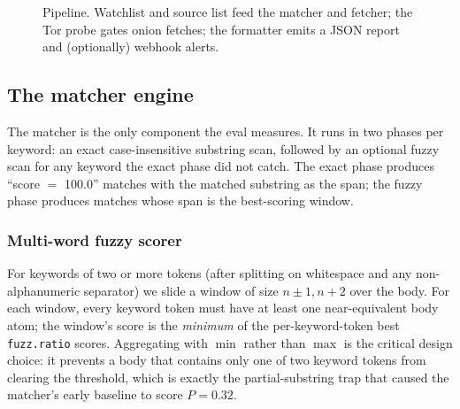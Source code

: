 \documentclass[conference]{IEEEtran}
\begin{document}
\begin{figure}[htbp]
\centering
{}
\caption{Pipeline. Watchlist and source list feed the matcher and
fetcher; the Tor probe gates onion fetches; the formatter emits a
JSON report and (optionally) webhook alerts.}
\label{fig:pipeline}
\end{figure}

\subsection{The matcher engine}
The matcher is the only component the eval measures. It runs in
two phases per keyword: an exact case-insensitive substring scan,
followed by an optional fuzzy scan for any keyword the exact phase
did not catch. The exact phase produces ``score $=$ 100.0''
matches with the matched substring as the span; the fuzzy phase
produces matches whose span is the best-scoring window.

\subsubsection{Multi-word fuzzy scorer}
For keywords of two or more tokens (after splitting on whitespace
and any non-alphanumeric separator) we slide a window of size
$n \pm 1, n + 2$ over the body. For each window, every keyword
token must have at least one near-equivalent body atom; the
window's score is the \emph{minimum} of the per-keyword-token best
\texttt{fuzz.ratio} scores. Aggregating with $\min$ rather than
$\max$ is the critical design choice: it prevents a body that
contains only one of two keyword tokens from clearing the
threshold, which is exactly the partial-substring trap that
caused the matcher's early baseline to score $P{=}0.32$.
\end{document}
